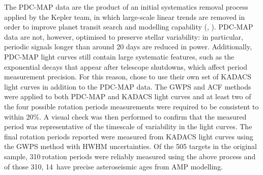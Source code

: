 \documentclass[10pt,preprint]{aastex}
\newcommand{\nastero}{310}
\newcommand{\nprecise}{14~}
\begin{document}
The PDC-MAP data are the product of an initial systematics removal process applied by the Kepler team, in which large-scale linear trends are removed in order to improve planet transit search and modelling capability (\citet{Smith_2012}, \citet{Stumpe_2012}).
PDC-MAP data are not, however, optimised to preserve stellar variability: in particular, periodic signals longer than around 20 days are reduced in power.
Additionally, PDC-MAP light curves still contain large systematic features, such as the exponential decays that appear after telescope shutdowns, which affect period measurement precision.
For this reason, \citet{Garcia2014} chose to use their own set of KADACS light curves in addition to the PDC-MAP data.
The GWPS and ACF methods were applied to both PDC-MAP and KADACS light curves and at least two of the four possible rotation periods measurements were required to be consistent to within 20\%.
A visual check was then performed to confirm that the measured period was representative of the timescale of variability in the light curves.
The final rotation periods reported were measured from KADACS light curves using the GWPS method with HWHM uncertainties.
Of the 505 targets in the original sample, \nastero$~$rotation periods were reliably measured using the above process and of those \nastero, \nprecise have precise asteroseismic ages from AMP modelling.
\end{document}

